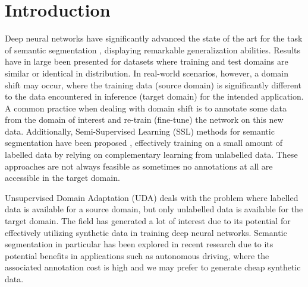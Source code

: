 \documentclass[10pt,twocolumn,letterpaper]{article}
\begin{document}
\section{Introduction}
Deep neural networks have significantly advanced the state of the art for the task of semantic segmentation \cite{long2014fully,DeepLabv1,PSPNet}, displaying remarkable generalization abilities. Results have in large been presented for datasets where training and test domains are similar or identical in distribution. In real-world scenarios, however, a domain shift may occur, where the training data (source domain) is significantly different to the data encountered in inference (target domain) for the intended application. A common practice when dealing with domain shift is to annotate some data from the domain of interest and re-train (fine-tune) the network on this new data. Additionally, Semi-Supervised Learning (SSL) methods for semantic segmentation have been proposed \cite{Hung,Mittal,French,Feng,chen2020leveraging,ClassMix}, effectively training on a small amount of labelled data by relying on complementary learning from unlabelled data. These approaches are not always feasible as sometimes no annotations at all are accessible in the target domain. 

Unsupervised Domain Adaptation (UDA) deals with the problem where labelled data is available for a source domain, but only unlabelled data is available for the target domain. The field has generated a lot of interest due to its potential for effectively utilizing synthetic data in training deep neural networks. Semantic segmentation in particular has been explored in recent research \cite{tsai2018learning,luo2019significanceaware,luo2018taking,yang2019adversarial,tsai2019domain,vu2018advent,zhang2018fully,zou2018domain,zou2019confidence,li2019bidirectional,yang2020contextaware,zheng2019unsupervised,zheng2020rectifying} due to its potential benefits in applications such as autonomous driving, where the associated annotation cost is high and we may prefer to generate cheap synthetic data.
\end{document}
